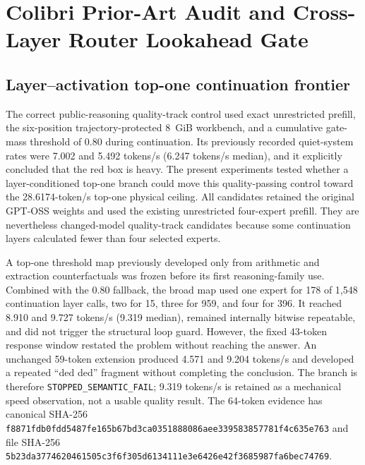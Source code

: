 \section{Colibri Prior-Art Audit and Cross-Layer Router Lookahead Gate}
\label{sec:colibri-lookahead-2026-09-12}


\subsection{Layer--activation top-one continuation frontier}
\label{subsec:gptoss120b-layer-activation-top1-20260912}

The correct public-reasoning quality-track control used exact unrestricted
prefill, the six-position trajectory-protected 8~GiB workbench, and a
cumulative gate-mass threshold of 0.80 during continuation.  Its previously
recorded quiet-system rates were 7.002 and 5.492 tokens/s (6.247 tokens/s
median), and it explicitly concluded that the red box is heavy.  The present
experiments tested whether a layer-conditioned top-one branch could move this
quality-passing control toward the 28.6174-token/s top-one physical ceiling.
All candidates retained the original GPT-OSS weights and used the existing
unrestricted four-expert prefill.  They are nevertheless changed-model
quality-track candidates because some continuation layers calculated fewer
than four selected experts.

A top-one threshold map previously developed only from arithmetic and
extraction counterfactuals was frozen before its first reasoning-family use.
Combined with the 0.80 fallback, the broad map used one expert for 178 of
1,548 continuation layer calls, two for 15, three for 959, and four for 396.
It reached 8.910 and 9.727 tokens/s (9.319 median), remained internally
bitwise repeatable, and did not trigger the structural loop guard.  However,
the fixed 43-token response window restated the problem without reaching the
answer.  An unchanged 59-token extension produced 4.571 and 9.204 tokens/s
and developed a repeated ``ded ded'' fragment without completing the
conclusion.  The branch is therefore
\texttt{STOPPED\_SEMANTIC\_FAIL}; 9.319 tokens/s is retained as a mechanical
speed observation, not a usable quality result.  The 64-token evidence has
canonical SHA-256
\texttt{f8871fdb0fdd5487fe165b67bd3ca0351888086aee339583857781f4c635e763}
and file SHA-256
\texttt{5b23da3774620461505c3f6f305d6134111e3e6426e42f3685987fa6bec74769}.

